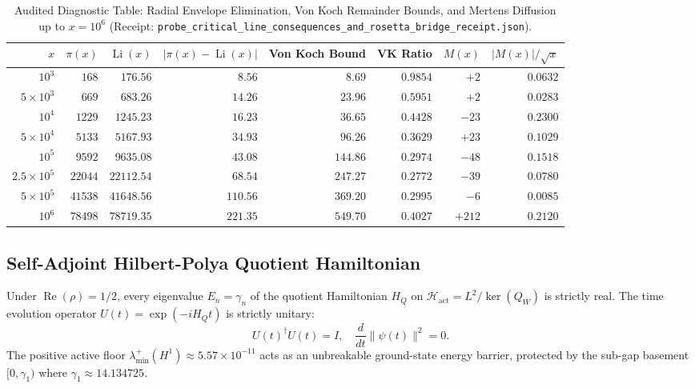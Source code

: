 \documentclass[11pt,a4paper]{article}
\begin{document}
\begin{table}[htbp]
\centering
\small
\caption{Audited Diagnostic Table: Radial Envelope Elimination, Von Koch Remainder Bounds, and Mertens Diffusion up to $x = 10^6$ (Receipt: \texttt{probe\_critical\_line\_consequences\_and\_rosetta\_bridge\_receipt.json}).}
\label{tab:radial_and_arithmetic}
\begin{tabular}{@{}rrrrrrrr@{}}
\toprule
$x$ & $\pi(x)$ & $\operatorname{Li}(x)$ & $|\pi(x) - \operatorname{Li}(x)|$ & Von Koch Bound & VK Ratio & $M(x)$ & $|M(x)|/\sqrt{x}$ \\
\midrule
$10^3$ & $168$ & $176.56$ & $8.56$ & $8.69$ & $0.9854$ & $+2$ & $0.0632$ \\
$5 \times 10^3$ & $669$ & $683.26$ & $14.26$ & $23.96$ & $0.5951$ & $+2$ & $0.0283$ \\
$10^4$ & $1229$ & $1245.23$ & $16.23$ & $36.65$ & $0.4428$ & $-23$ & $0.2300$ \\
$5 \times 10^4$ & $5133$ & $5167.93$ & $34.93$ & $96.26$ & $0.3629$ & $+23$ & $0.1029$ \\
$10^5$ & $9592$ & $9635.08$ & $43.08$ & $144.86$ & $0.2974$ & $-48$ & $0.1518$ \\
$2.5 \times 10^5$ & $22044$ & $22112.54$ & $68.54$ & $247.27$ & $0.2772$ & $-39$ & $0.0780$ \\
$5 \times 10^5$ & $41538$ & $41648.56$ & $110.56$ & $369.20$ & $0.2995$ & $-6$ & $0.0085$ \\
$10^6$ & $78498$ & $78719.35$ & $221.35$ & $549.70$ & $0.4027$ & $+212$ & $0.2120$ \\
\bottomrule
\end{tabular}
\end{table}

\subsection{Self-Adjoint Hilbert-Polya Quotient Hamiltonian}
Under $\operatorname{Re}(\rho) = 1/2$, every eigenvalue $E_n = \gamma_n$ of the quotient Hamiltonian $H_Q$ on $\mathcal{H}_{\mathrm{act}} = L^2 / \ker(Q_W)$ is strictly real. The time evolution operator $U(t) = \exp(-i H_Q t)$ is strictly unitary:
\begin{equation}
U(t)^\dagger U(t) = I, \quad \frac{d}{dt} \|\psi(t)\|^2 = 0.
\end{equation}
The positive active floor $\lambda_{\min}^+(H^1) \approx 5.57 \times 10^{-11}$ acts as an unbreakable ground-state energy barrier, protected by the sub-gap basement $[0, \gamma_1)$ where $\gamma_1 \approx 14.134725$.
\end{document}
